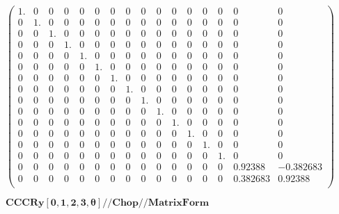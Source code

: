 \documentclass{article}
\begin{document}
\begin{doublespace}
\noindent\(\left(
\begin{array}{cccccccccccccccc}
 1. & 0 & 0 & 0 & 0 & 0 & 0 & 0 & 0 & 0 & 0 & 0 & 0 & 0 & 0 & 0 \\
 0 & 1. & 0 & 0 & 0 & 0 & 0 & 0 & 0 & 0 & 0 & 0 & 0 & 0 & 0 & 0 \\
 0 & 0 & 1. & 0 & 0 & 0 & 0 & 0 & 0 & 0 & 0 & 0 & 0 & 0 & 0 & 0 \\
 0 & 0 & 0 & 1. & 0 & 0 & 0 & 0 & 0 & 0 & 0 & 0 & 0 & 0 & 0 & 0 \\
 0 & 0 & 0 & 0 & 1. & 0 & 0 & 0 & 0 & 0 & 0 & 0 & 0 & 0 & 0 & 0 \\
 0 & 0 & 0 & 0 & 0 & 1. & 0 & 0 & 0 & 0 & 0 & 0 & 0 & 0 & 0 & 0 \\
 0 & 0 & 0 & 0 & 0 & 0 & 1. & 0 & 0 & 0 & 0 & 0 & 0 & 0 & 0 & 0 \\
 0 & 0 & 0 & 0 & 0 & 0 & 0 & 1. & 0 & 0 & 0 & 0 & 0 & 0 & 0 & 0 \\
 0 & 0 & 0 & 0 & 0 & 0 & 0 & 0 & 1. & 0 & 0 & 0 & 0 & 0 & 0 & 0 \\
 0 & 0 & 0 & 0 & 0 & 0 & 0 & 0 & 0 & 1. & 0 & 0 & 0 & 0 & 0 & 0 \\
 0 & 0 & 0 & 0 & 0 & 0 & 0 & 0 & 0 & 0 & 1. & 0 & 0 & 0 & 0 & 0 \\
 0 & 0 & 0 & 0 & 0 & 0 & 0 & 0 & 0 & 0 & 0 & 1. & 0 & 0 & 0 & 0 \\
 0 & 0 & 0 & 0 & 0 & 0 & 0 & 0 & 0 & 0 & 0 & 0 & 1. & 0 & 0 & 0 \\
 0 & 0 & 0 & 0 & 0 & 0 & 0 & 0 & 0 & 0 & 0 & 0 & 0 & 1. & 0 & 0 \\
 0 & 0 & 0 & 0 & 0 & 0 & 0 & 0 & 0 & 0 & 0 & 0 & 0 & 0 & 0.92388 & -0.382683 \\
 0 & 0 & 0 & 0 & 0 & 0 & 0 & 0 & 0 & 0 & 0 & 0 & 0 & 0 & 0.382683 & 0.92388 \\
\end{array}
\right)\)
\end{doublespace}

\begin{doublespace}
\noindent\(\pmb{\text{CCCRy}[0,1,2,3,\theta ]\text{//}\text{Chop}\text{//}\text{MatrixForm}}\)
\end{doublespace}
\end{document}

